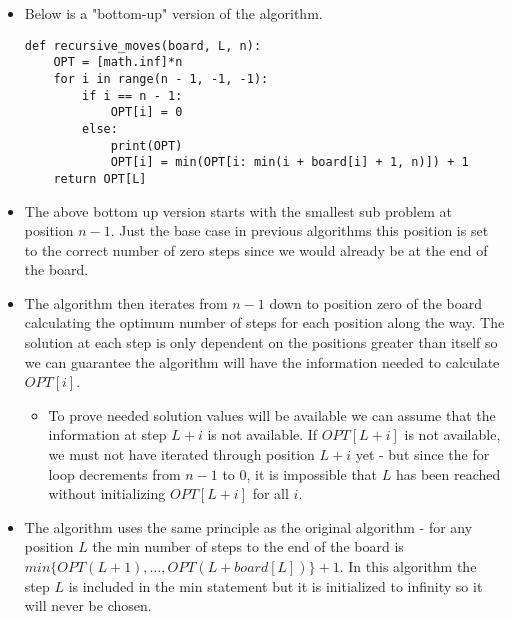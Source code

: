 \documentclass[letterpaper,11pt]{article}
\begin{document}
\begin{enumerate}
\begin{enumerate}
  \begin{itemize}
      \color{teal}
      \item Below is a "bottom-up" version of the algorithm.
\begin{verbatim}
def recursive_moves(board, L, n):
    OPT = [math.inf]*n
    for i in range(n - 1, -1, -1):
        if i == n - 1:
            OPT[i] = 0
        else:
            print(OPT)
            OPT[i] = min(OPT[i: min(i + board[i] + 1, n)]) + 1
    return OPT[L]

\end{verbatim}
    
    \item The above bottom up version starts with the smallest sub problem
        at position  $n-1$. Just the base case in previous algorithms this 
        position is set to the correct number of zero steps since we would
        already be at the end of the board. 
    \item The algorithm then iterates from $n-1$ down to position zero of the 
        board calculating the optimum number of steps for each position along
        the way. The solution at each step is only dependent on the positions 
        greater than itself so we can guarantee the algorithm will have the 
        information needed to calculate $OPT[i]$.
        \begin{itemize}
            \item To prove needed solution values will be available we can 
                assume that the information at step $L + i$ is not available.
                If $OPT[L+i]$ is not available, we must not have iterated 
                through position $L + i$ yet - but since the for loop decrements
                from $n-1$ to $0$, it is impossible that $L$ has been reached 
                without initializing $OPT[L+i]$ for all $i$.
        \end{itemize}
    \item The algorithm uses the same principle as the original algorithm - 
        for any position $L$ the min number of steps to the end of the board
        is $min \{OPT(L + 1), \ldots,  OPT(L + board[L])\} + 1$. In this 
        algorithm the step $L$ is included in the min statement but it is 
        initialized to infinity so it will never be chosen. 



  \end{itemize}



\end{enumerate}
\end{enumerate}
\end{document}
